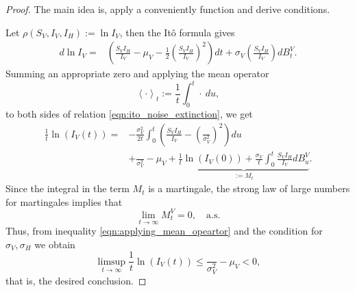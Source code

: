 \begin{proof}
    The main idea is, apply a conveniently function and derive conditions. 
    
    Let $\rho (S_V, I_V, I_H):= \ln I_V$, then the It\^{o} formula 
    gives
    \begin{equation} \label{eqn:ito_noise_extinction}
        \begin{aligned}
            d \ln I_V = & 
                \left(
                     \frac{S_V I_H}{ I_V} - \mu_V
                    - \frac{1}{2}
                    \left(
                        \frac{S_V I_H}{I_V}
                    \right) ^ 2
                \right) dt
                 + \sigma_V 
                \left(
                    \frac{S_V I_H}{ I_V}
                \right) dB_t ^ V.
        \end{aligned}
    \end{equation}
    Summing an appropriate zero and applying the mean operator
    $$
        \left < \cdot \right >_t
        := 
            \frac{1}{t}
            \int_{0} ^ t
                \cdot \ du,
    $$
    to both sides of relation \eqref{eqn:ito_noise_extinction}, we get
    \begin{equation} \label{eqn:applying_mean_opeartor}
        \begin{aligned}
            \frac{1}{t} \ln(I_V(t))
            =&
            - 
            \frac{\sigma_V ^ 2}{2t}
            \int_{0} ^ {t}
                \left(
                    \frac{S_V I_H}{I_V} 
                    -
                    \left(
                        \frac{}{\sigma_V ^ 2}
                    \right) ^ 2
                \right)
            du
            \\
            & + 
            \frac{}{\sigma_V ^ 2}
            - 
            \mu_V 
            + 
            \underbrace{
                \frac{1}{t} \ln(I_V(0))
                +
                \frac{\sigma_V}{t}
                \int_{0}^t
                    \frac{S_V I_H}{I_V}
                    dB_u^V
            }_{:=M_t} .                  
        \end{aligned}
    \end{equation}
%
    Since the integral in the term $M_t$ is a martingale, 
    the strong law of large numbers for martingales 
    {\citet[p. 12, Thm 3.4]{Mao2007}} implies that
    $$
        \lim_{t \to \infty} M_t^V = 0, \quad \text{a.s.}
    $$
    Thus, from inequality \eqref{eqn:applying_mean_opeartor} 
    and the condition for $\sigma_V, \sigma_H$
    we obtain
    \begin{equation}\label{eqn:bound_vector_noise}
        \limsup_{t \to \infty} 
            \frac{1}{t}
            \ln(I_V(t)) 
            \leq
            \frac{}{\sigma_V^2} - \mu_V < 0,           
    \end{equation}
    that is, the desired conclusion.
\end{proof}
%
%
%
